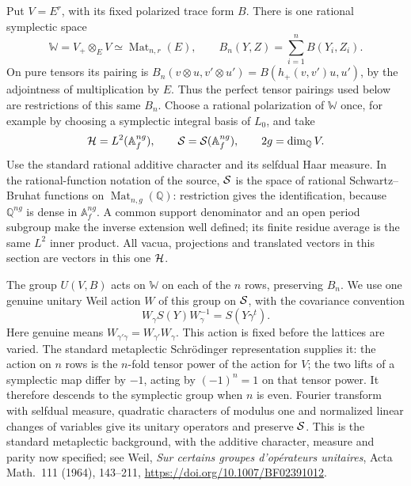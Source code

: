 Put \(V=E^r\), with its fixed polarized trace form \(B\).
There is one rational symplectic space
\[
 \mathbb W=V_+\otimes_E V
        \simeq \operatorname{Mat}_{n,r}(E),\qquad
 B_n(Y,Z)=\sum_{i=1}^n B(Y_i,Z_i).
\]
On pure tensors its pairing is
\(B_n(v\otimes u,v'\otimes u')
  =B(h_+(v,v')u,u')\), by the adjointness of multiplication
by \(E\).  Thus the perfect tensor pairings used below are
restrictions of this same \(B_n\).
Choose a rational polarization of \(\mathbb W\) once, for example
by choosing a symplectic integral basis of \(L_0\), and take
\[
 {\cal H}=L^2(\mathbb A_f^{ng}),\qquad
 {\cal S}={\cal S}(\mathbb A_f^{ng}),\qquad
                   2g=\dim_{\mathbb Q}V.
\]
Use the standard rational additive character and its selfdual
Haar measure.  In the rational-function notation of the source,
\({\cal S}\) is the space of rational Schwartz--Bruhat functions
on \(\operatorname{Mat}_{n,g}(\mathbb Q)\): restriction gives the
identification, because \(\mathbb Q^{ng}\) is dense in
\(\mathbb A_f^{ng}\).  A common support denominator and an open
period subgroup make the inverse extension well defined; its
finite residue average is the same \(L^2\) inner product.
All vacua, projections and translated vectors in this section
are vectors in this one \({\cal H}\).

The group \(U(V,B)\) acts on \(\mathbb W\) on each of the \(n\)
rows, preserving \(B_n\).  We use one genuine unitary Weil
action \(W\) of this group on \({\cal S}\), with the covariance
convention
\[
 W_\gamma S(Y)W_\gamma^{-1}=S(Y\gamma^t).
\]
Here genuine means \(W_{\gamma'\gamma}=W_{\gamma'}W_\gamma\).
This action is fixed before the lattices are varied.
The standard metaplectic Schr\"odinger representation supplies
it: the action on \(n\) rows is the \(n\)-fold tensor power of
the action for \(V\); the two lifts of a symplectic map differ
by \(-1\), acting by \((-1)^n=1\) on that tensor power.
It therefore descends to the symplectic group when \(n\) is
even.  Fourier transform with selfdual measure, quadratic
characters of modulus one and normalized linear changes of
variables give its unitary operators and preserve \({\cal S}\).
This is the standard metaplectic background, with the additive
character, measure and parity now specified; see Weil,
\emph{Sur certains groupes d'op\'erateurs unitaires},
Acta Math.\ 111 (1964), 143--211,
\url{https://doi.org/10.1007/BF02391012}.


